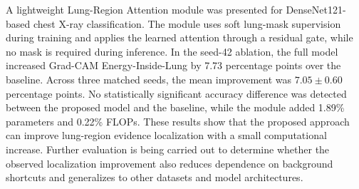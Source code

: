 \documentclass[sigconf,screen,nonacm]{acmart}
\begin{document}
A lightweight Lung-Region Attention module was presented for DenseNet121-based chest X-ray classification. The module uses soft lung-mask supervision during training and applies the learned attention through a residual gate, while no mask is required during inference. In the seed-42 ablation, the full model increased Grad-CAM Energy-Inside-Lung by 7.73 percentage points over the baseline. Across three matched seeds, the mean improvement was $7.05\pm0.60$ percentage points. No statistically significant accuracy difference was detected between the proposed model and the baseline, while the module added 1.89\% parameters and 0.22\% FLOPs. These results show that the proposed approach can improve lung-region evidence localization with a small computational increase. Further evaluation is being carried out to determine whether the observed localization improvement also reduces dependence on background shortcuts and generalizes to other datasets and model architectures.




\end{document}
